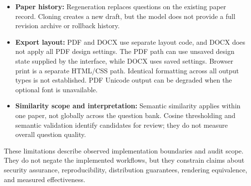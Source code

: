 \begin{itemize}
    \item \textbf{Paper history:} Regeneration replaces questions on the existing paper record. Cloning creates a new draft, but the model does not provide a full revision archive or rollback history.
    \item \textbf{Export layout:} PDF and DOCX use separate layout code, and DOCX does not apply all PDF design settings. The PDF path can use unsaved design state supplied by the interface, while DOCX uses saved settings. Browser print is a separate HTML/CSS path. Identical formatting across all output types is not established. PDF Unicode output can be degraded when the optional font is unavailable.
    \item \textbf{Similarity scope and interpretation:} Semantic similarity applies within one paper, not globally across the question bank. Cosine thresholding and semantic validation identify candidates for review; they do not measure overall question quality.
\end{itemize}

These limitations describe observed implementation boundaries and audit scope. They do not negate the implemented workflows, but they constrain claims about security assurance, reproducibility, distribution guarantees, rendering equivalence, and measured effectiveness.
